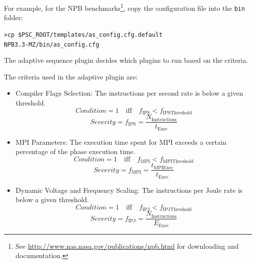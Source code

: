 \documentclass[11pt,a4paper, oneside]{book} %
\begin{document}
For example, for the NPB benchmarks\footnote{See \url{http://www.nas.nasa.gov/publications/npb.html} for downloading and documentation.}, copy the configuration file into the \texttt{bin} folder:
\begin{center}
\begin{minipage}{0.8\textwidth}
    \texttt{>cp~\$PSC\_ROOT/templates/as\_config.cfg.default\\
     NPB3.3-MZ/bin/as\_config.cfg}
\end{minipage}
\end{center}

The adaptive sequence plugin decides which plugins to run based on the criteria. 

The criteria used in the adaptive plugin are:

\begin{itemize}
  \item Compiler Flags Selection: The instructions per second rate is below a
      given threshold.
    \begin{equation}
      Condition = 1 \quad \text{iff} \quad f_{\text{IPS}} < f_{\text{IPSThreshold}}
    \end{equation}
    \begin{equation}
      Severity =  f_{\text{IPS}} = \frac{N_{\text{Instructions}}}{t_{\text{Exec}}}
    \end{equation}
  \item MPI Parameters: The execution time spent for MPI exceeds a certain
      percentage of the phase execution time.
    \begin{equation}
      Condition = 1 \quad \text{iff} \quad f_{\text{MPI}} < f_{\text{MPIThreshold}}
    \end{equation}
    \begin{equation}
      Severity =  f_{\text{MPI}} = \frac{t_{\text{MPIExec}}}{t_{\text{Exec}}}
    \end{equation}
  \item Dynamic Voltage and Frequency Scaling: The instructions per Joule rate
      is below a given threshold.
    \begin{equation}
      Condition = 1 \quad \text{iff} \quad f_{\text{IPJ}} < f_{\text{IPJThreshold}}
    \end{equation}
    \begin{equation}
      Severity =  f_{\text{IPJ}} = \frac{N_{\text{Instructions}}}{E_{\text{Exec}}}
    \end{equation}
\end{itemize}
\end{document}
